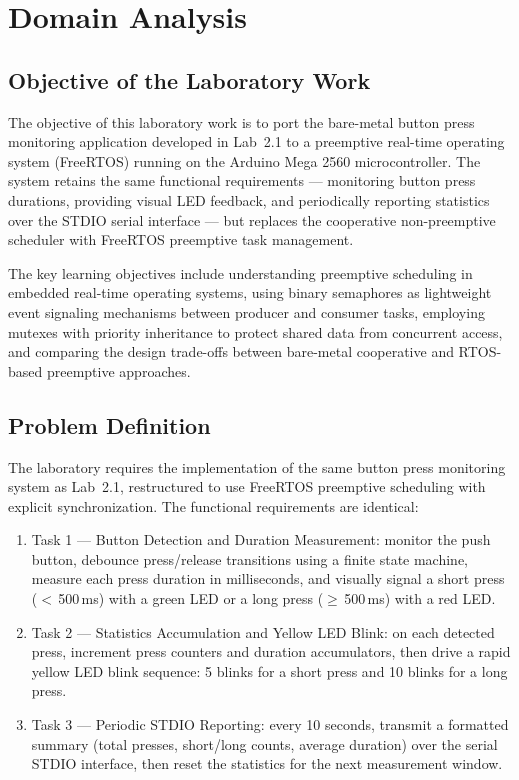 \section{Domain Analysis}

\subsection{Objective of the Laboratory Work}

The objective of this laboratory work is to port the bare-metal button press monitoring application developed in Lab~2.1 to a preemptive real-time operating system (FreeRTOS) running on the Arduino Mega 2560 microcontroller. The system retains the same functional requirements --- monitoring button press durations, providing visual LED feedback, and periodically reporting statistics over the STDIO serial interface --- but replaces the cooperative non-preemptive scheduler with FreeRTOS preemptive task management.

The key learning objectives include understanding preemptive scheduling in embedded real-time operating systems, using binary semaphores as lightweight event signaling mechanisms between producer and consumer tasks, employing mutexes with priority inheritance to protect shared data from concurrent access, and comparing the design trade-offs between bare-metal cooperative and RTOS-based preemptive approaches.

\subsection{Problem Definition}

The laboratory requires the implementation of the same button press monitoring system as Lab~2.1, restructured to use FreeRTOS preemptive scheduling with explicit synchronization. The functional requirements are identical:

\begin{enumerate}
    \item Task 1 --- Button Detection and Duration Measurement: monitor the push button, debounce press/release transitions using a finite state machine, measure each press duration in milliseconds, and visually signal a short press ($<$\,500\,ms) with a green LED or a long press ($\geq$\,500\,ms) with a red LED.
    \item Task 2 --- Statistics Accumulation and Yellow LED Blink: on each detected press, increment press counters and duration accumulators, then drive a rapid yellow LED blink sequence: 5 blinks for a short press and 10 blinks for a long press.
    \item Task 3 --- Periodic STDIO Reporting: every 10 seconds, transmit a formatted summary (total presses, short/long counts, average duration) over the serial STDIO interface, then reset the statistics for the next measurement window.
\end{enumerate}


